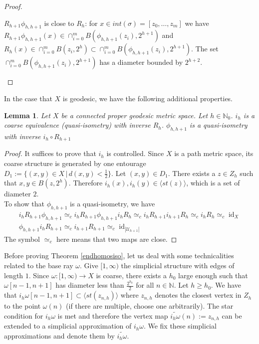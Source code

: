 \documentclass[a4paper,11pt]{article}
\theoremstyle{definition}
\theoremstyle{plain}
\newtheorem{lemma}[definition]{Lemma}
\theoremstyle{remark}
\DeclareMathOperator{\id}{id}
\begin{document}
{\begin{proof}
\begin{enumerate}
$R_{h+1}\phi_{h,h+1}$ is close to $R_{h}$: for $x \in int(\sigma) = [z_0,\dots,z_m]$ we have  $R_{h+1}\phi_{h,h+1}(x)\in \cap_{i=0}^{m}B(\phi_{h,h+1}(z_i),2^{h+1})$ and $R_{h}(x)\in \cap_{i=0}^{m}B(z_i,2^h)\subset \cap_{i=0}^{m}B(\phi_{h,h+1}(z_i),2^{h+1})$. The set $ \cap_{i=0}^{m}B(\phi_{h,h+1}(z_i),2^{h+1})$ has a diameter bounded by $2^{h+2}$. \\

\end{enumerate}




\end{proof}





In the case that $X$ is geodesic, we have the following additional properties. 

\begin{lemma} \label{geoprop} Let $X$ be a connected proper geodesic metric space. Let $h\in \mathbb{N}_{0}$. $i_{h}$ is a coarse equivalence (quasi-isometry) with inverse $R_{h}$. 
$\phi_{h,h+1}$ is a quasi-isometry with inverse $i_{h}\circ R_{h+1}$
\end{lemma}

\begin{proof} It suffices to prove that $i_{h}$ is controlled. Since $X$ is a path metric space, its coarse structure is generated by one entourage $D_{1}:= \{(x,y)\in X\,|\, d(x,y)<\frac{1}{2}\}$. Let $(x,y)\in D_{1}$. There exists a $z\in Z_{h}$ such that $x,y\in B(z,2^h)$. Therefore $i_{h}(x),i_{h}(y) \in \langle st(z) \rangle$, which is a set of diameter $2$. \\

To show that $\phi_{h,h+1}$ is a quasi-isometry, we have
\begin{align*}
i_{h} R_{h+1} \phi_{h,h+1} \simeq_{c} i_{h} R_{h+1} \phi_{h,h+1} i_{h} R_{h}\simeq_{c} i_{h} R_{h+1} i_{h+1} R_{h} \simeq_{c} i_{h} R_{h} \simeq_{c} \id_{X}\\
\phi_{h,h+1} i_{h} R_{h+1}  \simeq_{c} i_{h+1} R_{h+1}\simeq_{c} \id_{|\mathcal{U}_{h+1}|}
\end{align*}
The symbol $\simeq_{c}$ here means that two maps are close. 
\end{proof}

Before proving Theorem \ref{endhomosiso}, let us deal with some technicalities related to the base ray $\omega$. Give $[1,\infty)$ the simplicial structure with edges of length $1$. Since $\omega: [1,\infty)\rightarrow X$ is coarse, there exists a $h_{0}$ large enough such that $\omega[n-1,n+1]$ has diameter less than $\frac{2^{h_0}}{2}$ for all $n\in \mathbb{N}$. Let $h\geq h_0$. We have that $i_{h} \omega [n-1,n+1] \subset \langle st(z_{n,h}) \rangle$ where $z_{n,h}$ denotes the closest vertex in $Z_{h}$ to the point $\omega(n)$ (if there are multiple, choose one arbitrarily). The star condition for $i_{h}\omega$ is met and therefore the vertex map $\widetilde{i_{h}\omega}(n):= z_{n,h}$ can be extended to a simplicial approximation of $i_{h}\omega$. We fix these simplicial approximations and denote them by $\widetilde{i_{h}\omega}$. \\

}
\end{document}
